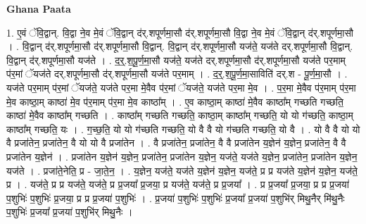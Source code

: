 \documentclass[17pt]{extarticle}
\begin{document}
\textbf{Ghana Paata } \newline

1. ए॒वं ॅवि॒द्वान्. वि॒द्वा ने॒व मे॒वं ॅवि॒द्वान् द॑र्.शपूर्णमा॒सौ द॑र्.शपूर्णमा॒सौ वि॒द्वा ने॒व मे॒वं ॅवि॒द्वान् द॑र्.शपूर्णमा॒सौ । . वि॒द्वान् द॑र्.शपूर्णमा॒सौ द॑र्.शपूर्णमा॒सौ वि॒द्वान्. वि॒द्वान् द॑र्.शपूर्णमा॒सौ यज॑ते॒ यज॑ते दर्.शपूर्णमा॒सौ वि॒द्वान्. वि॒द्वान् द॑र्.शपूर्णमा॒सौ यज॑ते । . द॒र्॒.श॒पू॒र्ण॒मा॒सौ यज॑ते॒ यज॑ते दर्.शपूर्णमा॒सौ द॑र्.शपूर्णमा॒सौ यज॑ते पर॒माम् प॑र॒मां ॅयज॑ते दर्.शपूर्णमा॒सौ द॑र्.शपूर्णमा॒सौ यज॑ते पर॒माम् । . द॒र्॒.श॒पू॒र्ण॒मा॒साविति॑ दर्.श - पू॒र्ण॒मा॒सौ । . यज॑ते पर॒माम् प॑र॒मां ॅयज॑ते॒ यज॑ते पर॒मा मे॒वैव प॑र॒मां ॅयज॑ते॒ यज॑ते पर॒मा मे॒व । . प॒र॒मा मे॒वैव प॑र॒माम् प॑र॒मा मे॒व काष्ठा॒म् काष्ठा॑ मे॒व प॑र॒माम् प॑र॒मा मे॒व काष्ठा᳚म् । . ए॒व काष्ठा॒म् काष्ठा॑ मे॒वैव काष्ठा᳚म् गच्छति गच्छति॒ काष्ठा॑ मे॒वैव काष्ठा᳚म् गच्छति । . काष्ठा᳚म् गच्छति गच्छति॒ काष्ठा॒म् काष्ठा᳚म् गच्छति॒ यो यो ग॑च्छति॒ काष्ठा॒म् काष्ठा᳚म् गच्छति॒ यः । . ग॒च्छ॒ति॒ यो यो ग॑च्छति गच्छति॒ यो वै वै यो ग॑च्छति गच्छति॒ यो वै । . यो वै वै यो यो वै प्रजा॑तेन॒ प्रजा॑तेन॒ वै यो यो वै प्रजा॑तेन । . वै प्रजा॑तेन॒ प्रजा॑तेन॒ वै वै प्रजा॑तेन य॒ज्ञेन॑ य॒ज्ञेन॒ प्रजा॑तेन॒ वै वै प्रजा॑तेन य॒ज्ञेन॑ । . प्रजा॑तेन य॒ज्ञेन॑ य॒ज्ञेन॒ प्रजा॑तेन॒ प्रजा॑तेन य॒ज्ञेन॒ यज॑ते॒ यज॑ते य॒ज्ञेन॒ प्रजा॑तेन॒ प्रजा॑तेन य॒ज्ञेन॒ यज॑ते । . प्रजा॑ते॒नेति॒ प्र - जा॒ते॒न॒ । . य॒ज्ञेन॒ यज॑ते॒ यज॑ते य॒ज्ञेन॑ य॒ज्ञेन॒ यज॑ते॒ प्र प्र यज॑ते य॒ज्ञेन॑ य॒ज्ञेन॒ यज॑ते॒ प्र । . यज॑ते॒ प्र प्र यज॑ते॒ यज॑ते॒ प्र प्र॒जया᳚ प्र॒जया॒ प्र यज॑ते॒ यज॑ते॒ प्र प्र॒जया᳚ । . प्र प्र॒जया᳚ प्र॒जया॒ प्र प्र प्र॒जया॑ प॒शुभिः॑ प॒शुभिः॑ प्र॒जया॒ प्र प्र प्र॒जया॑ प॒शुभिः॑ । . प्र॒जया॑ प॒शुभिः॑ प॒शुभिः॑ प्र॒जया᳚ प्र॒जया॑ प॒शुभि॑र् मिथु॒नैर् मि॑थु॒नैः प॒शुभिः॑ प्र॒जया᳚ प्र॒जया॑ प॒शुभि॑र् मिथु॒नैः । \newline
\end{document}
